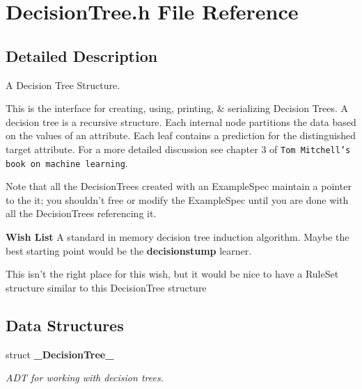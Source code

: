 \section{Decision\-Tree.h File Reference}
\label{DecisionTree_8h}


\subsection{Detailed Description}
A Decision Tree Structure. 

This is the interface for creating, using, printing, \& serializing Decision Trees. A decision tree is a recursive structure. Each internal node partitions the data based on the values of an attribute. Each leaf contains a prediction for the distinguished target attribute. For a more detailed discussion see chapter 3 of {\tt Tom Mitchell's book on machine learning}.

Note that all the Decision\-Trees created with an Example\-Spec maintain a pointer to the it; you shouldn't free or modify the Example\-Spec until you are done with all the Decision\-Trees referencing it.

\begin{Desc}
\item[{\bf Wish List}]A standard in memory decision tree induction algorithm. Maybe the best starting point would be the {\bf decisionstump} learner. 

This isn't the right place for this wish, but it would be nice to have a Rule\-Set structure similar to this Decision\-Tree structure \end{Desc}


\subsection*{Data Structures}
\begin{CompactItemize}
\item 
struct {\bf \_\-Decision\-Tree\_\-}
\begin{CompactList}\small\item\em ADT for working with decision trees. \item\end{CompactList}\end{CompactItemize}
